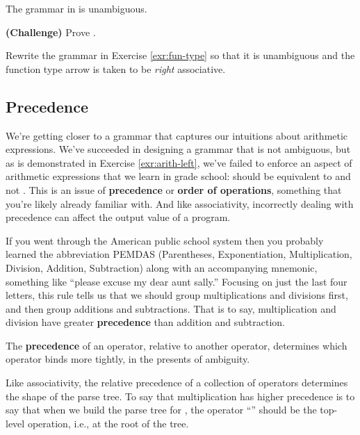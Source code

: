 \begin{proposition}
  \label{prop:arith-left-unambig}
  The grammar in  is unambiguous.
\end{proposition}

\begin{exercise}
  \textbf{(Challenge)}
  Prove .
\end{exercise}

\begin{exercise}
  Rewrite the grammar in Exercise \ref{exr:fun-type} so that it is unambiguous and the function type arrow is taken to be \textit{right} associative.
\end{exercise}

\subsection{Precedence}

We're getting closer to a grammar that captures our intuitions about arithmetic expressions.
We've succeeded in designing a grammar that is not ambiguous, but as is demonstrated in Exercise \ref{exr:arith-left}, we've failed to enforce an aspect of arithmetic expressions that we learn in grade school:  should be equivalent to  and not .
This is an issue of \textbf{precedence} or \textbf{order of operations}, something that you're likely already familiar with.
And like associativity, incorrectly dealing with precedence can affect the output value of a program.

If you went through the American public school system then you probably learned the abbreviation PEMDAS (Parentheses, Exponentiation, Multiplication, Division, Addition, Subtraction) along with an accompanying mnemonic, something like \enquote{please excuse my dear aunt sally.}
Focusing on just the last four letters, this rule tells us that we should group multiplications and divisions first, and then group additions and subtractions.
That is to say, multiplication and division have greater \textbf{precedence} than addition and subtraction.

\begin{definition}
  The \textbf{precedence} of an operator, relative to another operator, determines which operator binds more tightly, in the presents of ambiguity.
\end{definition}
%
Like associativity, the relative precedence of a collection of operators determines the shape of the parse tree.
To say that multiplication has higher precedence is to say that when we build the parse tree for , the operator \enquote{\codel{+}} should be the top-level operation, i.e., at the root of the tree.

